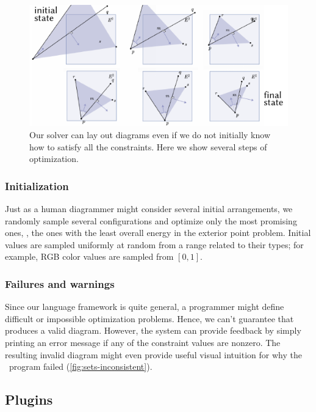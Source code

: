 \begin{figure}[t]
   \centering
   \includegraphics[scale=1.5]{assets/penrose/OptimizationProgress.pdf}
   \caption{Our solver can lay out diagrams even if we do not initially know how to satisfy all the constraints. Here we show several steps of optimization.\label{fig:OptimizationProgress}}
\end{figure}

\subsubsection{Initialization}

Just as a human diagrammer might consider several initial arrangements, we randomly sample several configurations and optimize only the most promising ones, \ie, the ones with the least overall energy in the exterior point problem.  Initial values are sampled uniformly at random from a range related to their types; for example, RGB color values are sampled from \([0,1]\).

\subsubsection{Failures and warnings}

Since our language framework is quite general, a programmer might define difficult or impossible optimization problems.  Hence, we can't guarantee that \Penrose{} produces a valid diagram.  However, the system can provide feedback by simply printing an error message if any of the constraint values are nonzero.  The resulting invalid diagram might even provide useful visual intuition for why the \Style\ program failed (\cref{fig:sets-inconsistent}).

\subsection{Plugins}
\label{sec:PlugIns}

